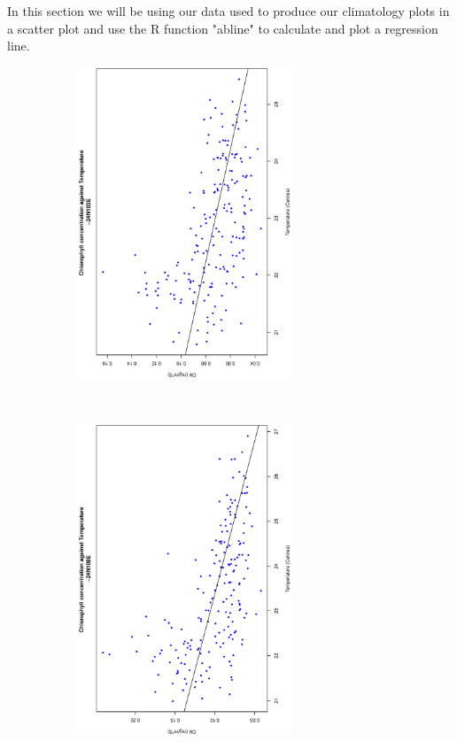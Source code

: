 In this section we will be using our data used to produce our climatology plots in a scatter plot and use the R function "abline" to calculate and plot a regression line.

\begin{figure}[ht]
    \centering
    \begin{subfigure}[t]{0.5\textwidth}
        \centering
        \includegraphics[width=0.7\textwidth, angle =-90]{Chapter3/-24,103/Data_-24N103E_Regression.eps}
    \end{subfigure}%
    ~
    \begin{subfigure}[t]{0.5\textwidth}
        \centering
        \includegraphics[width=0.7\textwidth, angle =-90]{Chapter3/-24,108/Data_-24N108E_Regression.eps}

\end{subfigure}
\end{figure}
